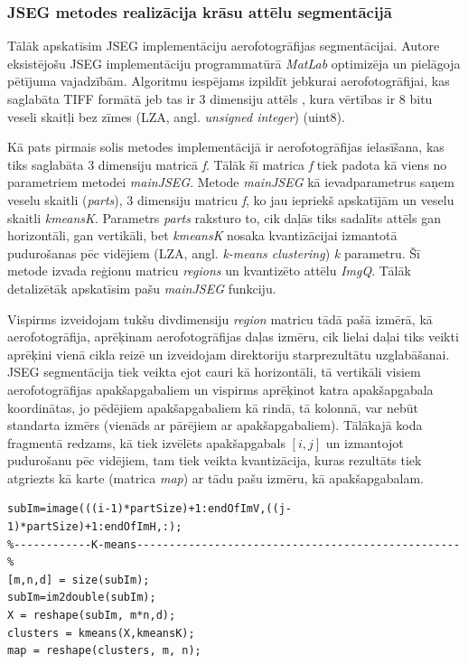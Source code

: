 \documentclass[12pt,paper=a4]{report}
\begin{document}
\subsubsection{JSEG metodes realizācija krāsu attēlu segmentācijā}Tālāk apskatīsim JSEG implementāciju aerofotogrāfijas segmentācijai. Autore eksistējošu JSEG implementāciju programmatūrā \textit{MatLab} optimizēja un pielāgoja pētījuma vajadzībām. Algoritmu iespējams izpildīt jebkurai aerofotogrāfijai, kas saglabāta TIFF formātā jeb tas ir 3 dimensiju attēls , kura vērtības ir 8 bitu veseli skaitļi bez zīmes (LZA, angl. \textit{unsigned integer}) (uint8). \par
Kā pats pirmais solis metodes implementācijā ir aerofotogrāfijas ielasīšana, kas tiks saglabāta 3 dimensiju matricā \textit{f}. Tālāk šī matrica \textit{f} tiek padota kā viens no parametriem metodei \textit{mainJSEG}. Metode \textit{mainJSEG} kā ievadparametrus saņem veselu skaitli (\textit{parts}), 3 dimensiju matricu \textit{f}, ko jau iepriekš apskatījām un veselu skaitli \textit{kmeansK}. Parametrs \textit{parts} raksturo to, cik daļās tiks sadalīts attēls gan horizontāli, gan vertikāli, bet \textit{kmeansK} nosaka kvantizācijai izmantotā pudurošanas pēc vidējiem (LZA, angl. \textit{k-means clustering}) \textit{k} parametru. Šī metode izvada reģionu matricu \textit{regions} un kvantizēto attēlu \textit{ImgQ}. Tālāk detalizētāk apskatīsim pašu \textit{mainJSEG} funkciju. \par
Vispirms izveidojam tukšu divdimensiju \textit{region} matricu tādā pašā izmērā, kā aerofotogrāfija, aprēķinam aerofotogrāfijas daļas izmēru, cik lielai daļai tiks veikti aprēķini vienā cikla reizē un izveidojam direktoriju starprezultātu uzglabāšanai. JSEG segmentācija tiek veikta ejot cauri kā horizontāli, tā vertikāli visiem aerofotogrāfijas apakšapgabaliem un vispirms aprēķinot katra apakšapgabala koordinātas, jo pēdējiem apakšapgabaliem kā rindā, tā kolonnā, var nebūt standarta izmērs (vienāds ar pārējiem ar apakšapgabaliem). Tālākajā koda fragmentā redzams, kā tiek izvēlēts apakšapgabals $[i,j]$ un izmantojot pudurošanu pēc vidējiem, tam tiek veikta kvantizācija, kuras rezultāts tiek atgriezts kā karte (matrica \textit{map}) ar tādu pašu izmēru, kā apakšapgabalam.
\begin{lstlisting}
subIm=image(((i-1)*partSize)+1:endOfImV,((j-1)*partSize)+1:endOfImH,:);
%------------K-means--------------------------------------------------%
[m,n,d] = size(subIm);
subIm=im2double(subIm);
X = reshape(subIm, m*n,d);
clusters = kmeans(X,kmeansK);
map = reshape(clusters, m, n);
\end{lstlisting}\par 
\end{document}
